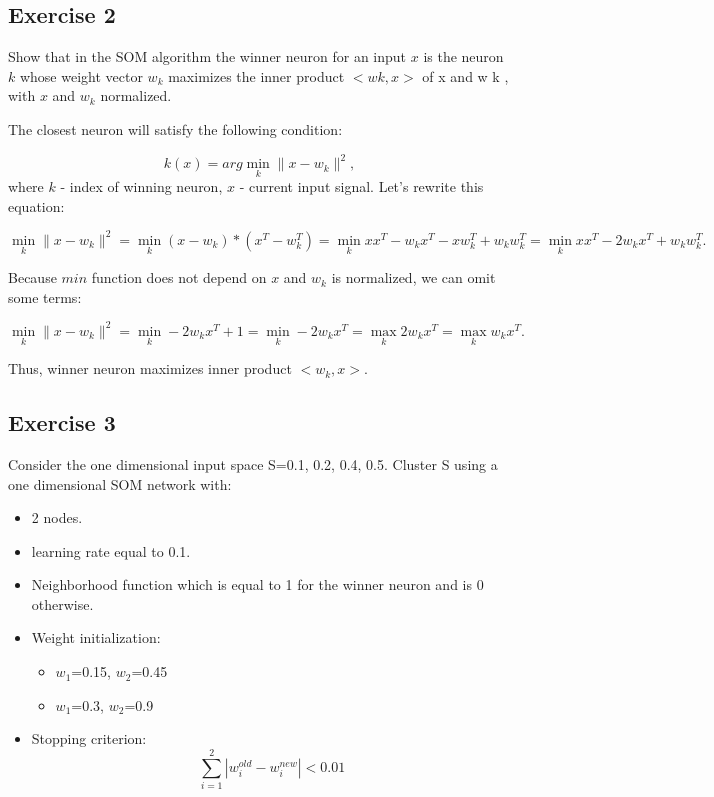 \documentclass[a4paper, 12pt]{article}
\begin{document}
\subsection{Exercise 2}
Show that in the SOM algorithm the winner neuron for an input $x$ is the neuron $k$ whose weight vector $w_k$ maximizes the inner product $< w k ,x >$ of x and w k , with $x$ and $w_k$ normalized.


The closest neuron will satisfy the following condition:

\begin{equation}
k(x) = arg \min\limits_k \parallel x-w_k \parallel^2,
\end{equation}
where $k$ - index of winning neuron, $x$ - current input signal. Let's rewrite this equation:

\begin{equation}
\min\limits_k \parallel x-w_k \parallel^2 = \min\limits_k (x-w_k)*(x^T-w_k^T) =  \min\limits_k x x^T-w_k x^T - x w_k^T + w_k w_k^T = \min\limits_k x x^T - 2  w_k x^T + w_k w_k^T.
\end{equation}

Because $min$ function does not depend on $x$ and $w_k$ is normalized, we can omit some terms:
 
\begin{equation}
\min\limits_k \parallel x-w_k \parallel^2 =\min\limits_k  - 2 w_k x^T + 1 = \min\limits_k  - 2 w_k x^T = \max\limits_k 2 w_k x^T = \max\limits_k w_k x^T.
\end{equation}

Thus, winner neuron maximizes inner product $<w_k,x>$.
\subsection{Exercise 3}

Consider the one dimensional input space S={0.1, 0.2, 0.4, 0.5}.
Cluster S using a one dimensional SOM network with:

\begin{itemize}
\item 2 nodes.
\item learning rate equal to 0.1.
\item Neighborhood function which is equal to 1 for the winner neuron and is 0 otherwise.
\item Weight initialization:
\begin{itemize}
\item $w_1$=0.15, $w_2$=0.45
\item $w_1$=0.3, $w_2$=0.9
\end{itemize}
\item Stopping criterion: $$\sum_{i=1}^2|w_i^{old} - w_i^{new}| < 0.01$$
\end{itemize}
\end{document}
